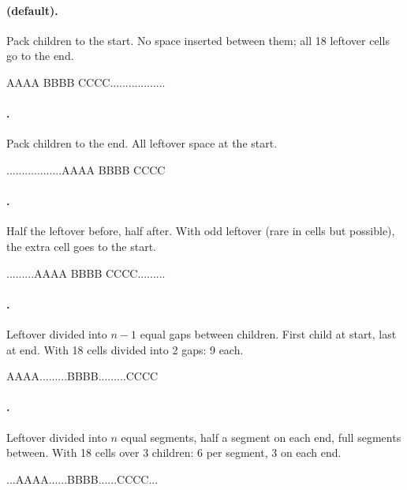 \paragraph{ (default).} Pack children to the start.
No space inserted between them; all 18 leftover cells go to the
end.

\begin{terminalbox}
AAAA BBBB CCCC..................
\end{terminalbox}

\paragraph{.} Pack children to the end. All leftover
space at the start.

\begin{terminalbox}
..................AAAA BBBB CCCC
\end{terminalbox}

\paragraph{.} Half the leftover before, half after.
With odd leftover (rare in cells but possible), the extra cell
goes to the start.

\begin{terminalbox}
.........AAAA BBBB CCCC.........
\end{terminalbox}

\paragraph{.} Leftover divided into
$n - 1$ equal gaps between children. First child at start, last at
end. With 18 cells divided into 2 gaps: 9 each.

\begin{terminalbox}
AAAA.........BBBB.........CCCC
\end{terminalbox}

\paragraph{.} Leftover divided into $n$ equal
segments, half a segment on each end, full segments between.
With 18 cells over 3 children: 6 per segment, 3 on each end.

\begin{terminalbox}
...AAAA......BBBB......CCCC...
\end{terminalbox}

